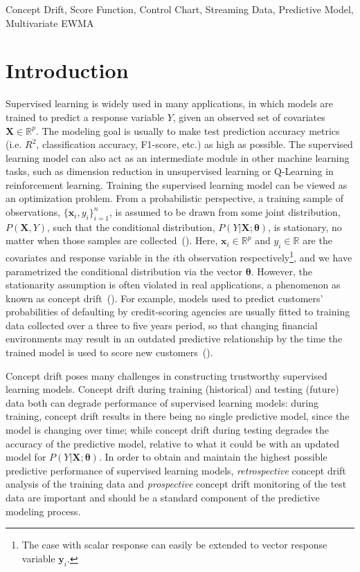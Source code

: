 \documentclass[twoside,11pt]{article}
\begin{document}
\begin{keywords} 	
  Concept Drift, Score Function, Control Chart, Streaming Data, Predictive Model, Multivariate EWMA
\end{keywords}

\section{Introduction}
Supervised learning is widely used in many applications, in which models are trained to predict a response variable $Y$, given an observed set of covariates $\bm{X} \in \mathbb{R}^p$. The modeling goal is usually to make test prediction accuracy metrics (i.e. $R^2$, classification accuracy, F1-score, etc.) as high as possible. The supervised learning model can also act as an intermediate module in other machine learning tasks, such as dimension reduction in unsupervised learning or Q-Learning in reinforcement learning. Training the supervised learning model can be viewed as an optimization problem. From a probabilistic perspective, a training sample of observations, $\{\bm {x}_i, y_i\}_{i=1}^n$, is assumed to be drawn from some joint distribution, $P (\bm {X}, Y)$, such that the conditional distribution, $P(Y|\bm{X};\bm{\theta})$, is stationary, no matter when those samples are collected~(\cite{hulten2001mining}). Here, {$\bm {x}_i \in \mathbb{R}^{p}$ and $y_i \in \mathbb{R}$ are the covariates and response variable in the $i$th observation respectively}\footnote{The case with scalar response can easily be extended to vector response variable $\bm {y}_i$.}, and we have parametrized the conditional distribution via the vector $\bm{\theta}$. However, the stationarity assumption is often violated in real applications, a phenomenon as known as concept drift~(\cite{moreno2012unifying,vzliobaite2016overview}). For example, models used to predict customers' probabilities of defaulting by credit-scoring agencies are usually fitted to training data collected over a three to five years period, so that changing financial environments may result in an outdated predictive relationship by the time the trained model is used to score new customers~(\cite{crook1992degradation,vzliobaite2016overview}). 

Concept drift poses many challenges in constructing trustworthy supervised learning models. Concept drift during training (historical) and testing (future) data both can degrade performance of supervised learning models: during training, concept drift results in there being no single predictive model, since the model is changing over time; while concept drift during testing degrades the accuracy of the predictive model, relative to what it could be with an updated model for $P(Y|\bm{X};\bm{\theta})$. In order to obtain and maintain the highest possible predictive performance of supervised learning models, \textit{retrospective} concept drift analysis of the training data and \textit{prospective} concept drift monitoring of the test data are important and should be a standard component of the predictive modeling process.
\end{document}
